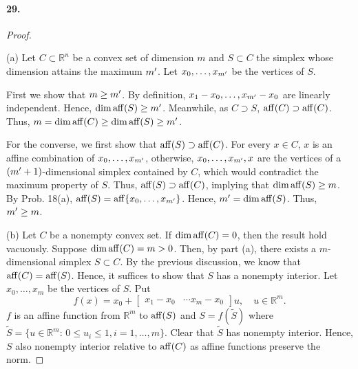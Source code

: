   \paragraph{29.}
  \begin{proof}
    $\,$\par
    (a) Let $C\subset\mathbb{R}^n$ be a convex set of dimension $m$ and $S
    \subset C$ the simplex whose dimension attains the maximum $m^\prime$. Let 
    $x_0,\dots,x_{m^\prime}$ be the vertices of $S$.\par
    First we show that $m\ge m^\prime$. By definition, $x_1-x_0,\dots,x_{m^\prime}-x_0$
    are linearly independent. Hence, $\dim\operatorname{aff}(S)\ge m^\prime$. Meanwhile, as $C
    \supset S$, $\operatorname{aff}(C)\supset\operatorname{aff}(C)$. Thus, $m=\dim\operatorname{aff}(C)\ge\dim\operatorname{aff}(S)\ge 
    m^\prime$.\par
    For the converse, we first show that $\operatorname{aff}(S)\supset\operatorname{aff}(C)$. For every
    $x\in C$, $x$ is an affine combination of $x_0,\dots,x_{m^\prime}$, otherwise,
    $x_0,\dots,x_{m^\prime},x$ are the vertices of a $(m^\prime+1)$-dimensional 
    simplex contained by $C$, which would contradict the maximum property of 
    $S$. Thus, $\operatorname{aff}(S)\supset\operatorname{aff}(C)$, implying that $\dim\operatorname{aff}(S)\ge m$. By 
    Prob. 18(a), $\operatorname{aff}(S)=\operatorname{aff}\{x_0,\dots,x_{m^\prime}\}$. Hence, $m^\prime=\dim\operatorname{aff}
    (S)$. Thus, $m^\prime\ge m$.\par
    (b) Let $C$ be a nonempty convex set. If $\dim\operatorname{aff}(C)=0$, then the result
    hold vacuously. Suppose $\dim\operatorname{aff}(C)=m>0$. Then, by part (a), there exists
    a $m$-dimensional simplex $S\subset C$. By the previous discussion, we know
    that $\operatorname{aff}(C)=\operatorname{aff}(S)$. Hence, it suffices to show that $S$ has a nonempty
    interior. Let $x_0,\dots,x_m$ be the vertices of $S$. Put
    \[
      f(x)=x_0+\begin{bmatrix}
        x_1-x_0 & \cdots x_m-x_0
      \end{bmatrix}u,
      \quad u\in\mathbb{R}^m.
    \]
    $f$ is an affine function from $\mathbb{R}^m$ to $\operatorname{aff}(S)$ and $S=f
    (\tilde{S})$ where $\tilde{S}=\{u\in\mathbb{R}^m:\, 0\le u_i\le 1,i=1,
    \dots,m\}$. Clear that $\tilde{S}$ has nonempty interior. Hence, $S$ also
    nonempty interior relative to $\operatorname{aff}(C)$ as affine functions preserve the
    norm.
  \end{proof}
  
